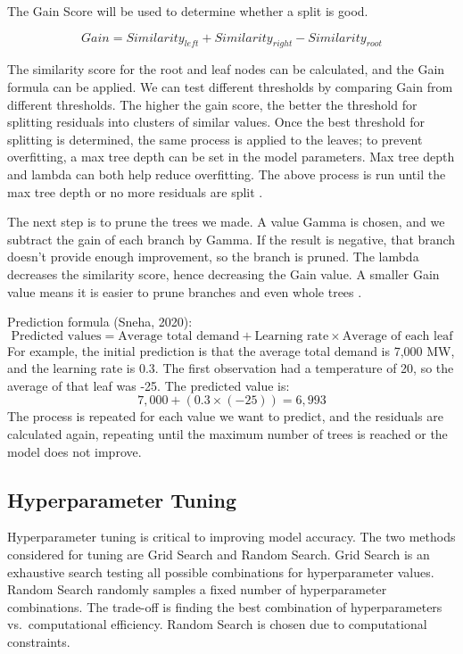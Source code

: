 \documentclass[mstat,12pt]{unswthesis}
\begin{document}
The Gain Score will be used to determine whether a split is good.

\[
Gain = {Similarity}_{left} + {Similarity}_{right} - {Similarity}_{root}
\]

The similarity score for the root and leaf nodes can be calculated, and
the Gain formula can be applied. We can test different thresholds by
comparing Gain from different thresholds. The higher the gain score, the
better the threshold for splitting residuals into clusters of similar
values. Once the best threshold for splitting is determined, the same
process is applied to the leaves; to prevent overfitting, a max tree
depth can be set in the model parameters. Max tree depth and lambda can
both help reduce overfitting. The above process is run until the max
tree depth or no more residuals are split \cite{a2016_how}.

The next step is to prune the trees we made. A value Gamma is chosen,
and we subtract the gain of each branch by Gamma. If the result is
negative, that branch doesn't provide enough improvement, so the branch
is pruned. The lambda decreases the similarity score, hence decreasing
the Gain value. A smaller Gain value means it is easier to prune
branches and even whole trees \cite{a2016_how}.

Prediction formula (Sneha, 2020): \[
\text{Predicted values} = \text{Average total demand} + \text{Learning rate} \times \text{Average of each leaf}
\] For example, the initial prediction is that the average total demand
is 7,000 MW, and the learning rate is 0.3. The first observation had a
temperature of 20, so the average of that leaf was -25. The predicted
value is: \[
7,000 + (0.3 \times (-25)) = 6,993
\] The process is repeated for each value we want to predict, and the
residuals are calculated again, repeating until the maximum number of
trees is reached or the model does not improve.

\subsection{Hyperparameter Tuning}\label{hyperparameter-tuning}

Hyperparameter tuning is critical to improving model accuracy. The two
methods considered for tuning are Grid Search and Random Search. Grid
Search is an exhaustive search testing all possible combinations for
hyperparameter values. Random Search randomly samples a fixed number of
hyperparameter combinations. The trade-off is finding the best
combination of hyperparameters vs.~computational efficiency. Random
Search is chosen due to computational constraints.
\end{document}
